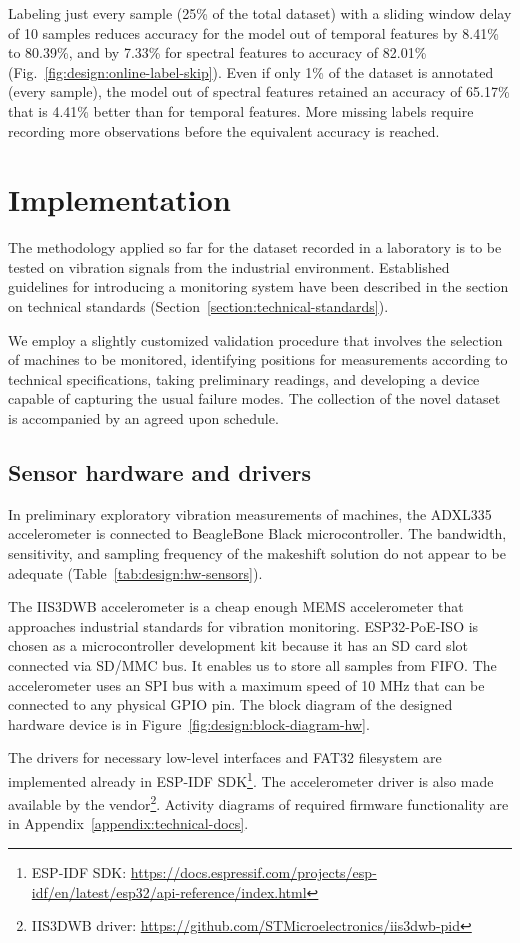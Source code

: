 Labeling just every  sample (25\% of the total dataset) with a sliding window delay of 10 samples reduces accuracy for the model out of temporal features by 8.41\% to 80.39\%, and by 7.33\% for spectral features to accuracy of 82.01\% (Fig.~\ref{fig:design:online-label-skip}). Even if only 1\% of the dataset is annotated (every  sample), the model out of spectral features retained an accuracy of 65.17\% that is 4.41\% better than for temporal features.  More missing labels require recording more observations before the equivalent accuracy is reached.

\chapter{Implementation} \label{section:implementation} 
The methodology applied so far for the dataset recorded in a laboratory is to be tested on vibration signals from the industrial environment. Established guidelines for introducing a monitoring system have been described in the section on technical standards (Section~\ref{section:technical-standards}). 

We employ a slightly customized validation procedure that involves the selection of machines to be monitored, identifying positions for measurements according to technical specifications, taking preliminary readings, and developing a device capable of capturing the usual failure modes. The collection of the novel dataset is accompanied by an agreed upon schedule.


\section{Sensor hardware and drivers}
In preliminary exploratory vibration measurements of machines, the ADXL335 accelerometer is connected to BeagleBone Black microcontroller. The bandwidth, sensitivity, and sampling frequency of the makeshift solution do not appear to be adequate (Table~\ref{tab:design:hw-sensors}).



The IIS3DWB accelerometer is a cheap enough MEMS accelerometer that approaches industrial standards for vibration monitoring. ESP32-PoE-ISO is chosen as a microcontroller development kit because it has an SD card slot connected via SD/MMC bus. It enables us to store all samples from FIFO. The accelerometer uses an SPI bus with a maximum speed of 10 MHz that can be connected to any physical GPIO pin. The block diagram of the designed hardware device is in Figure~\ref{fig:design:block-diagram-hw}.



The drivers for necessary low-level interfaces and FAT32 filesystem are  implemented already in ESP-IDF SDK\footnote{ESP-IDF SDK: \url{https://docs.espressif.com/projects/esp-idf/en/latest/esp32/api-reference/index.html}}. The accelerometer driver is also made available by the vendor\footnote{IIS3DWB driver: \url{https://github.com/STMicroelectronics/iis3dwb-pid}}. Activity diagrams of required firmware functionality are in Appendix~\ref{appendix:technical-docs}.





